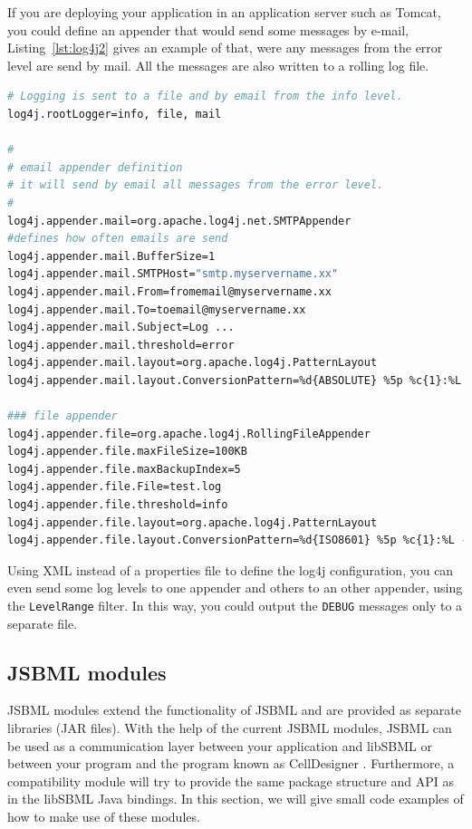 If you are deploying your application in an application server such as Tomcat,
you could define an appender that would send some messages by e-mail,
Listing~\vref{lst:log4j2} gives an example of that, were any messages from the
error level
%
are send by mail. All the messages are also written to a rolling log
file.
\begin{lstlisting}[language=bash,%numbers=none,
caption={SMTPAppender log4j example.}, label=lst:log4j2]
# Logging is sent to a file and by email from the info level.
log4j.rootLogger=info, file, mail

#
# email appender definition
# it will send by email all messages from the error level.
#
log4j.appender.mail=org.apache.log4j.net.SMTPAppender
#defines how often emails are send
log4j.appender.mail.BufferSize=1
log4j.appender.mail.SMTPHost="smtp.myservername.xx"
log4j.appender.mail.From=fromemail@myservername.xx
log4j.appender.mail.To=toemail@myservername.xx
log4j.appender.mail.Subject=Log ...
log4j.appender.mail.threshold=error
log4j.appender.mail.layout=org.apache.log4j.PatternLayout
log4j.appender.mail.layout.ConversionPattern=%d{ABSOLUTE} %5p %c{1}:%L - %m%n

### file appender
log4j.appender.file=org.apache.log4j.RollingFileAppender
log4j.appender.file.maxFileSize=100KB
log4j.appender.file.maxBackupIndex=5
log4j.appender.file.File=test.log
log4j.appender.file.threshold=info
log4j.appender.file.layout=org.apache.log4j.PatternLayout
log4j.appender.file.layout.ConversionPattern=%d{ISO8601} %5p %c{1}:%L - %m%n
\end{lstlisting}

Using XML instead of a properties file to define the log4j configuration, you
can even send some log levels
%
to one appender and others to an other appender,
using the \texttt{LevelRange} filter. In this way, you could output the
\texttt{DEBUG} messages only to a separate file.


\subsection{JSBML modules}

JSBML modules extend the functionality of JSBML and are provided as separate
libraries (JAR files). With the help of the current JSBML modules, JSBML can be
used as a communication layer  between your
application and libSBML \citep{Bornstein2008} or between your program and the
program known as CellDesigner \citep{Funahashi2003}. Furthermore, a
compatibility module
%
will try to provide the same package structure and API as in the libSBML Java
bindings. In this section, we will give small code examples of how to make use
of these modules.

